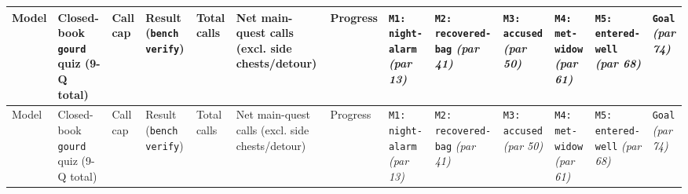 \documentclass[11pt,a4paper]{article}
\begin{document}
\begin{landscape}
{\footnotesize\setlength{\tabcolsep}{3pt}
\begin{longtable}{@{}>{\RaggedRight\arraybackslash}p{}>{\RaggedRight\arraybackslash}p{}>{\RaggedRight\arraybackslash}p{}>{\RaggedRight\arraybackslash}p{}>{\RaggedRight\arraybackslash}p{}>{\RaggedRight\arraybackslash}p{}>{\RaggedRight\arraybackslash}p{}>{\RaggedRight\arraybackslash}p{}>{\RaggedRight\arraybackslash}p{}>{\RaggedRight\arraybackslash}p{}>{\RaggedRight\arraybackslash}p{}>{\RaggedRight\arraybackslash}p{}>{\RaggedRight\arraybackslash}p{}@{}}
\toprule
Model & Closed-\allowbreak{}book \texttt{gourd} quiz (9-Q total) & Call cap & Result (\texttt{bench\allowbreak{} \allowbreak{}verify}) & Total calls & Net main-quest calls (excl. side chests/detour) & Progress & \texttt{M1\allowbreak{}:\allowbreak{} \allowbreak{}night\allowbreak{}-\allowbreak{}alarm} \emph{(par 13)} & \texttt{M2\allowbreak{}:\allowbreak{} \allowbreak{}recovered\allowbreak{}-\allowbreak{}bag} \emph{(par 41)} & \texttt{M3\allowbreak{}:\allowbreak{} \allowbreak{}accused} \emph{(par 50)} & \texttt{M4\allowbreak{}:\allowbreak{} \allowbreak{}met\allowbreak{}-\allowbreak{}widow} \emph{(par 61)} & \texttt{M5\allowbreak{}:\allowbreak{} \allowbreak{}entered\allowbreak{}-\allowbreak{}well} \emph{(par 68)} & \texttt{Goal} \emph{(par 74)} \\
\midrule\endfirsthead
\toprule
Model & Closed-\allowbreak{}book \texttt{gourd} quiz (9-Q total) & Call cap & Result (\texttt{bench\allowbreak{} \allowbreak{}verify}) & Total calls & Net main-quest calls (excl. side chests/detour) & Progress & \texttt{M1\allowbreak{}:\allowbreak{} \allowbreak{}night\allowbreak{}-\allowbreak{}alarm} \emph{(par 13)} & \texttt{M2\allowbreak{}:\allowbreak{} \allowbreak{}recovered\allowbreak{}-\allowbreak{}bag} \emph{(par 41)} & \texttt{M3\allowbreak{}:\allowbreak{} \allowbreak{}accused} \emph{(par 50)} & \texttt{M4\allowbreak{}:\allowbreak{} \allowbreak{}met\allowbreak{}-\allowbreak{}widow} \emph{(par 61)} & \texttt{M5\allowbreak{}:\allowbreak{} \allowbreak{}entered\allowbreak{}-\allowbreak{}well} \emph{(par 68)} & \texttt{Goal} \emph{(par 74)} \\

\end{longtable}}
\end{landscape}
\end{document}
